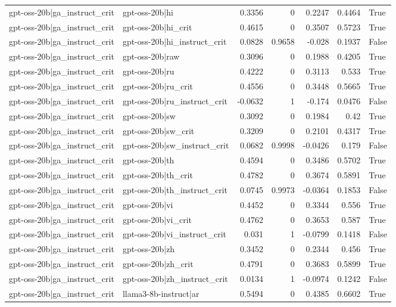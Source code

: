\begin{table}
\begin{tabular}{l l r r r r l}
gpt-oss-20b|ga_instruct_crit & gpt-oss-20b|hi & 0.3356 & 0 & 0.2247 & 0.4464 & True \\
gpt-oss-20b|ga_instruct_crit & gpt-oss-20b|hi_crit & 0.4615 & 0 & 0.3507 & 0.5723 & True \\
gpt-oss-20b|ga_instruct_crit & gpt-oss-20b|hi_instruct_crit & 0.0828 & 0.9658 & -0.028 & 0.1937 & False \\
gpt-oss-20b|ga_instruct_crit & gpt-oss-20b|raw & 0.3096 & 0 & 0.1988 & 0.4205 & True \\
gpt-oss-20b|ga_instruct_crit & gpt-oss-20b|ru & 0.4222 & 0 & 0.3113 & 0.533 & True \\
gpt-oss-20b|ga_instruct_crit & gpt-oss-20b|ru_crit & 0.4556 & 0 & 0.3448 & 0.5665 & True \\
gpt-oss-20b|ga_instruct_crit & gpt-oss-20b|ru_instruct_crit & -0.0632 & 1 & -0.174 & 0.0476 & False \\
gpt-oss-20b|ga_instruct_crit & gpt-oss-20b|sw & 0.3092 & 0 & 0.1984 & 0.42 & True \\
gpt-oss-20b|ga_instruct_crit & gpt-oss-20b|sw_crit & 0.3209 & 0 & 0.2101 & 0.4317 & True \\
gpt-oss-20b|ga_instruct_crit & gpt-oss-20b|sw_instruct_crit & 0.0682 & 0.9998 & -0.0426 & 0.179 & False \\
gpt-oss-20b|ga_instruct_crit & gpt-oss-20b|th & 0.4594 & 0 & 0.3486 & 0.5702 & True \\
gpt-oss-20b|ga_instruct_crit & gpt-oss-20b|th_crit & 0.4782 & 0 & 0.3674 & 0.5891 & True \\
gpt-oss-20b|ga_instruct_crit & gpt-oss-20b|th_instruct_crit & 0.0745 & 0.9973 & -0.0364 & 0.1853 & False \\
gpt-oss-20b|ga_instruct_crit & gpt-oss-20b|vi & 0.4452 & 0 & 0.3344 & 0.556 & True \\
gpt-oss-20b|ga_instruct_crit & gpt-oss-20b|vi_crit & 0.4762 & 0 & 0.3653 & 0.587 & True \\
gpt-oss-20b|ga_instruct_crit & gpt-oss-20b|vi_instruct_crit & 0.031 & 1 & -0.0799 & 0.1418 & False \\
gpt-oss-20b|ga_instruct_crit & gpt-oss-20b|zh & 0.3452 & 0 & 0.2344 & 0.456 & True \\
gpt-oss-20b|ga_instruct_crit & gpt-oss-20b|zh_crit & 0.4791 & 0 & 0.3683 & 0.5899 & True \\
gpt-oss-20b|ga_instruct_crit & gpt-oss-20b|zh_instruct_crit & 0.0134 & 1 & -0.0974 & 0.1242 & False \\
gpt-oss-20b|ga_instruct_crit & llama3-8b-instruct|ar & 0.5494 & 0 & 0.4385 & 0.6602 & True \\

\end{tabular}
\end{table}
